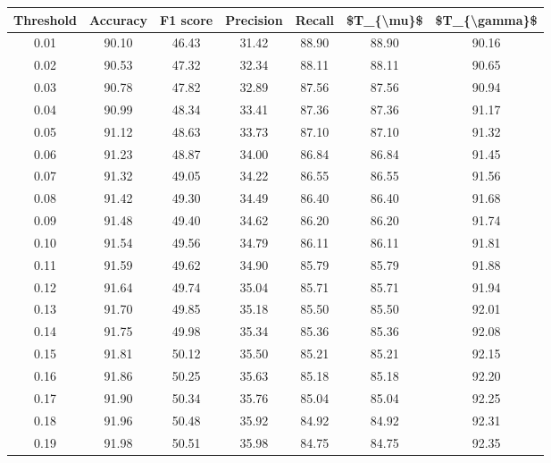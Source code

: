 \begin{tabular}{|c|c|c|c|c|c|c|}
\hline
 Threshold &  Accuracy &  F1 score &  Precision &  Recall &  \$T\_\{\textbackslash mu\}\$ &  \$T\_\{\textbackslash gamma\}\$ \\
\hline
      0.01 &     90.10 &     46.43 &      31.42 &   88.90 &      88.90 &         90.16 \\
      0.02 &     90.53 &     47.32 &      32.34 &   88.11 &      88.11 &         90.65 \\
      0.03 &     90.78 &     47.82 &      32.89 &   87.56 &      87.56 &         90.94 \\
      0.04 &     90.99 &     48.34 &      33.41 &   87.36 &      87.36 &         91.17 \\
      0.05 &     91.12 &     48.63 &      33.73 &   87.10 &      87.10 &         91.32 \\
      0.06 &     91.23 &     48.87 &      34.00 &   86.84 &      86.84 &         91.45 \\
      0.07 &     91.32 &     49.05 &      34.22 &   86.55 &      86.55 &         91.56 \\
      0.08 &     91.42 &     49.30 &      34.49 &   86.40 &      86.40 &         91.68 \\
      0.09 &     91.48 &     49.40 &      34.62 &   86.20 &      86.20 &         91.74 \\
      0.10 &     91.54 &     49.56 &      34.79 &   86.11 &      86.11 &         91.81 \\
      0.11 &     91.59 &     49.62 &      34.90 &   85.79 &      85.79 &         91.88 \\
      0.12 &     91.64 &     49.74 &      35.04 &   85.71 &      85.71 &         91.94 \\
      0.13 &     91.70 &     49.85 &      35.18 &   85.50 &      85.50 &         92.01 \\
      0.14 &     91.75 &     49.98 &      35.34 &   85.36 &      85.36 &         92.08 \\
      0.15 &     91.81 &     50.12 &      35.50 &   85.21 &      85.21 &         92.15 \\
      0.16 &     91.86 &     50.25 &      35.63 &   85.18 &      85.18 &         92.20 \\
      0.17 &     91.90 &     50.34 &      35.76 &   85.04 &      85.04 &         92.25 \\
      0.18 &     91.96 &     50.48 &      35.92 &   84.92 &      84.92 &         92.31 \\
      0.19 &     91.98 &     50.51 &      35.98 &   84.75 &      84.75 &         92.35 \\

\end{tabular}
